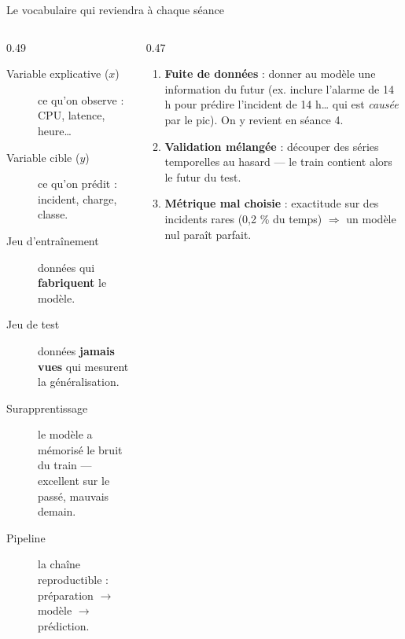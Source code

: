 \begin{frame}{Le vocabulaire qui reviendra à chaque séance}
\begin{columns}[t]
\begin{column}{0.49\textwidth}
\begin{kbox}
\begin{description}
\item[Variable explicative ($x$)] ce qu'on observe : CPU, latence, heure\ldots
\item[Variable cible ($y$)] ce qu'on prédit : incident, charge, classe.
\item[Jeu d'entraînement] données qui \textbf{fabriquent} le modèle.
\item[Jeu de test] données \textbf{jamais vues} qui mesurent la généralisation.
\item[Surapprentissage] le modèle a mémorisé le bruit du train ---
excellent sur le passé, mauvais demain.
\item[Pipeline] la chaîne reproductible : préparation $\to$ modèle $\to$ prédiction.
\end{description}
\end{kbox}
\end{column}
\begin{column}{0.47\textwidth}
\begin{wbox}
\begin{enumerate}
\item \textbf{Fuite de données} : donner au modèle une information
du futur (ex. inclure l'alarme de 14 h pour prédire l'incident de 14 h\ldots
qui est \emph{causée} par le pic). On y revient en séance 4.
\item \textbf{Validation mélangée} : découper des séries temporelles au hasard
--- le train contient alors le futur du test.
\item \textbf{Métrique mal choisie} : exactitude sur des incidents rares
(0,2 \% du temps) $\Rightarrow$ un modèle nul paraît parfait.
\end{enumerate}
\end{wbox}
\end{column}
\end{columns}
\end{frame}

